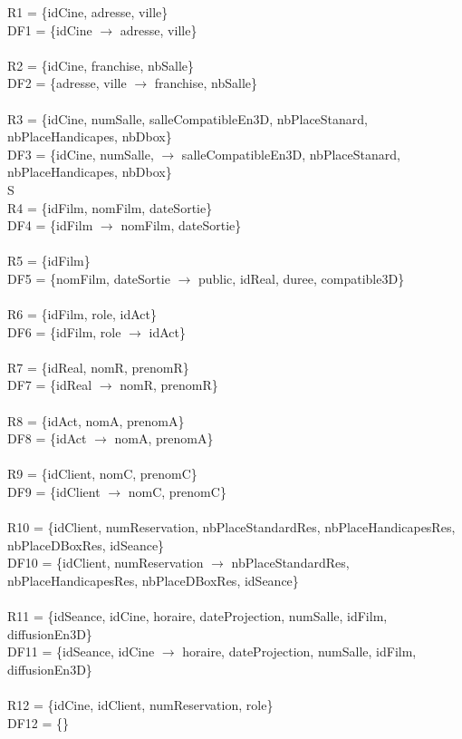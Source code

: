 \documentclass[a4paper,sffamily,12pt]{article}
\begin{document}
						\noindent R1 = \{idCine, adresse, ville\} \\  DF1 = \{idCine $\rightarrow$ adresse, ville\} \\
						\\
						R2 = \{idCine, franchise, nbSalle\} \\ DF2 = \{adresse, ville $\rightarrow$ franchise, nbSalle\} \\
						\\
						R3 = \{idCine, numSalle, salleCompatibleEn3D, nbPlaceStanard, nbPlaceHandicapes, nbDbox\} \\ DF3 = \{idCine, numSalle, $\rightarrow$ salleCompatibleEn3D, nbPlaceStanard, nbPlaceHandicapes, nbDbox\} \\S
						\\
						R4 = \{idFilm, nomFilm, dateSortie\} \\ DF4 = \{idFilm $\rightarrow$ nomFilm, dateSortie\} \\
						\\
						R5 = \{idFilm\} \\ DF5 = \{nomFilm, dateSortie $\rightarrow$ public, idReal, duree, compatible3D\} \\	
						\\							
						R6 = \{idFilm, role, idAct\} \\ DF6 = \{idFilm, role $\rightarrow$  idAct\} \\
						\\
						R7 = \{idReal, nomR, prenomR\} \\ DF7 = \{idReal $\rightarrow$ nomR, prenomR\} \\
						\\
						R8 = \{idAct, nomA, prenomA\} \\ DF8 = \{idAct $\rightarrow$ nomA, prenomA\} \\
						\\
						R9 = \{idClient, nomC, prenomC\} \\ DF9 = \{idClient $\rightarrow$ nomC, prenomC\} \\ 
						\\
						R10 = \{idClient, numReservation, nbPlaceStandardRes, nbPlaceHandicapesRes, nbPlaceDBoxRes, idSeance\} \\ DF10 = \{idClient, numReservation $\rightarrow$  nbPlaceStandardRes, nbPlaceHandicapesRes, nbPlaceDBoxRes, idSeance\} \\
						\\
						R11 = \{idSeance, idCine, horaire, dateProjection, numSalle, idFilm, diffusionEn3D\} \\ DF11 = \{idSeance, idCine $\rightarrow$ horaire, dateProjection, numSalle, idFilm, diffusionEn3D\} \\
						\\
						R12 = \{idCine, idClient, numReservation, role\} \\ DF12 = \{\} \\
\end{document}

